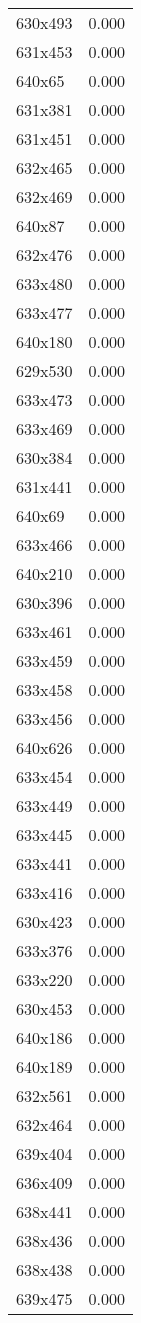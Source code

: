 \begin{table}
\begin{tabular}{lr}
630x493 & 0.000 \\
631x453 & 0.000 \\
640x65 & 0.000 \\
631x381 & 0.000 \\
631x451 & 0.000 \\
632x465 & 0.000 \\
632x469 & 0.000 \\
640x87 & 0.000 \\
632x476 & 0.000 \\
633x480 & 0.000 \\
633x477 & 0.000 \\
640x180 & 0.000 \\
629x530 & 0.000 \\
633x473 & 0.000 \\
633x469 & 0.000 \\
630x384 & 0.000 \\
631x441 & 0.000 \\
640x69 & 0.000 \\
633x466 & 0.000 \\
640x210 & 0.000 \\
630x396 & 0.000 \\
633x461 & 0.000 \\
633x459 & 0.000 \\
633x458 & 0.000 \\
633x456 & 0.000 \\
640x626 & 0.000 \\
633x454 & 0.000 \\
633x449 & 0.000 \\
633x445 & 0.000 \\
633x441 & 0.000 \\
633x416 & 0.000 \\
630x423 & 0.000 \\
633x376 & 0.000 \\
633x220 & 0.000 \\
630x453 & 0.000 \\
640x186 & 0.000 \\
640x189 & 0.000 \\
632x561 & 0.000 \\
632x464 & 0.000 \\
639x404 & 0.000 \\
636x409 & 0.000 \\
638x441 & 0.000 \\
638x436 & 0.000 \\
638x438 & 0.000 \\
639x475 & 0.000 \\

\end{tabular}
\end{table}
